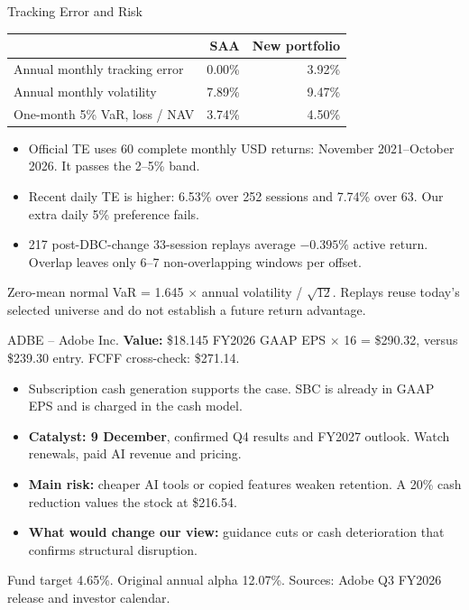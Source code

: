 \documentclass[aspectratio=169,11pt,t]{beamer}
\newcommand{\smnote}[1]{{\footnotesize\color{muted}#1}}
\newcommand{\tight}{\setlength{\itemsep}{0.45em}\setlength{\parskip}{0pt}}
\begin{document}
\begin{frame}{Tracking Error and Risk}
\vspace{.1em}
\begin{center}\small
\begin{tabular}{lrr}\toprule
& SAA & New portfolio\\\midrule
Annual monthly tracking error&0.00\%&3.92\%\\
Annual monthly volatility&7.89\%&9.47\%\\
One-month 5\% VaR, loss / NAV&3.74\%&4.50\%\\\bottomrule
\end{tabular}\end{center}
\begin{itemize}\tight
\item Official TE uses 60 complete monthly USD returns: November 2021--October 2026. It passes the 2--5\% band.
\item Recent daily TE is higher: 6.53\% over 252 sessions and 7.74\% over 63. Our extra daily 5\% preference fails.
\item 217 post-DBC-change 33-session replays average $-0.395\%$ active return. Overlap leaves only 6--7 non-overlapping windows per offset.
\end{itemize}
\smnote{Zero-mean normal VaR = 1.645 $\times$ annual volatility / $\sqrt{12}$. Replays reuse today's selected universe and do not establish a future return advantage.}
\end{frame}


\begin{frame}{ADBE -- Adobe Inc.}
\vspace{.1em}
\textbf{Value:} \$18.145 FY2026 GAAP EPS $\times$ 16 = \$290.32, versus \$239.30 entry. FCFF cross-check: \$271.14.
\begin{itemize}\tight
\item Subscription cash generation supports the case. SBC is already in GAAP EPS and is charged in the cash model.
\item \textbf{Catalyst: 9 December}, confirmed Q4 results and FY2027 outlook. Watch renewals, paid AI revenue and pricing.
\item \textbf{Main risk:} cheaper AI tools or copied features weaken retention. A 20\% cash reduction values the stock at \$216.54.
\item \textbf{What would change our view:} guidance cuts or cash deterioration that confirms structural disruption.
\end{itemize}
\smnote{Fund target 4.65\%. Original annual alpha 12.07\%. Sources: Adobe Q3 FY2026 release and investor calendar.}
\end{frame}
\end{document}
